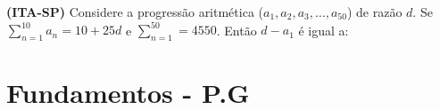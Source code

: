 \begin{questions}
  \vspace{0.5cm}

  \question \textbf{(ITA-SP)} Considere a progressão aritmética ($a_{1}, a_{2}, a_{3}, \dots, a_{50}$) de razão $d$. Se $\displaystyle \sum_{n = 1}^{10} a_{n} = 10 + 25d$ e $\displaystyle \sum_{n = 1}^{50} = 4550$. Então $d - a_{1}$ é igual a:
  \vspace{0.4cm}

  \begin{oneparchoices}
  \end{oneparchoices}

\end{questions}

\section*{Fundamentos - P.G}

